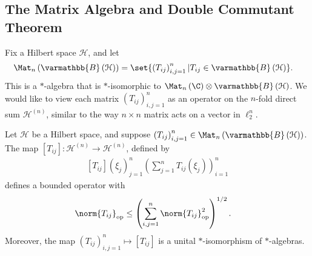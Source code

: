 \documentclass[10pt]{mypackage}
\renewcommand*{\mathbb}[1]{\varmathbb{#1}}
\newcommand{\B}{\mathbb{B}}
\begin{document}
\subsection{The Matrix Algebra and Double Commutant Theorem}%
Fix a Hilbert space $\mathcal{H}$, and let
\begin{align*}
  \Mat_n\left(\B\left(\mathcal{H}\right)\right) &= \set{\left(T_{ij}\right)_{i,j=1}^{n} | T_{ij}\in \B\left(\mathcal{H}\right)}.
\end{align*}
This is a $\ast$-algebra that is $\ast$-isomorphic to $\Mat_n\left(\C\right) \otimes \B\left(\mathcal{H}\right)$. We would like to view each matrix $\left(T_{ij}\right)_{i,j=1}^{n}$ as an operator on the $n$-fold direct sum $\mathcal{H}^{(n)}$, similar to the way $n\times n$ matrix acts on a vector in $\ell_2^{n}$.
\begin{proposition}
  Let $\mathcal{H}$ be a Hilbert space, and suppose $\left(T_{ij}\right)_{i,j=1}^{n}\in \Mat_{n}\left(\B\left(\mathcal{H}\right)\right)$. The map $\left[T_{ij}\right]\colon \mathcal{H}^{(n)}\rightarrow \mathcal{H}^{(n)}$, defined by
  \begin{align*}
    \left[T_{ij}\right]\left(\xi_j\right)_{j=1}^{n}\left(\sum_{j=1}^{n}T_{ij}\left(\xi_j\right)\right)_{i=1}^{n}
  \end{align*}
  defines a bounded operator with 
  \begin{align*}
    \norm{T_{ij}}_{\text{op}} &\leq \left(\sum_{i,j=1}^{n}\norm{T_{ij}}_{\text{op}}^2\right)^{1/2}.
  \end{align*}
  Moreover, the map $\left(T_{ij}\right)_{i,j=1}^{n}\mapsto \left[T_{ij}\right]$ is a unital $\ast$-isomorphism of $\ast$-algebras.
\end{proposition}
\end{document}

